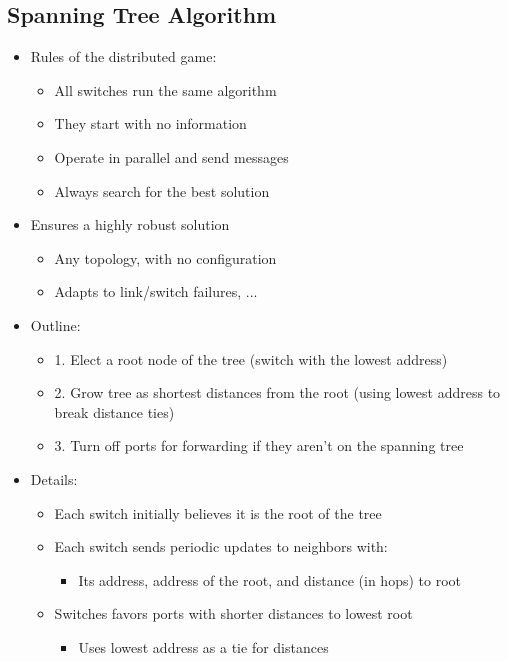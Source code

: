 \documentclass[12pt]{ctexart}   %
\begin{document}
	\subsection{Spanning Tree Algorithm }
	\begin{itemize}
		\item Rules of the distributed game:
		\begin{itemize}
			\item All switches run the same algorithm
			\item They start with no information
			\item Operate in parallel and send messages
			\item Always search for the best solution
		\end{itemize}
		
		\item Ensures a highly robust solution
		\begin{itemize}
			\item Any topology, with no configuration
			\item Adapts to link/switch failures, ...
		\end{itemize}
		
		\item Outline:
		\begin{itemize}
			\item {\color{blue} 1.} Elect a root node of the tree (switch with the lowest address)
			\item {\color{blue} 2.} Grow tree as shortest distances from the root (using lowest address to break distance ties)
			\item {\color{blue} 3.} Turn off ports for forwarding if they aren't on the spanning tree
		\end{itemize}
		
		\item Details:  
		\begin{itemize}
			\item Each switch initially believes it is the root of the tree
			\item Each switch sends periodic updates to neighbors with:
			\begin{itemize}
				\item Its address, address of the root, and distance (in hops) to root
			\end{itemize}
			
			\item Switches favors ports with shorter distances to lowest root
			\begin{itemize}
				\item Uses lowest address as a tie for distances
			\end{itemize}
		\end{itemize}
		

\end{itemize}
\end{document}
